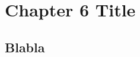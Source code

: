
\chapter{Chapter 6 Title}
\label{chapter:6}
\minitoc
\newpage
\graphicspath{{2-Chapters/6-Chapter/Images/}}

\section{Blabla}
\label{sec:blabla}

